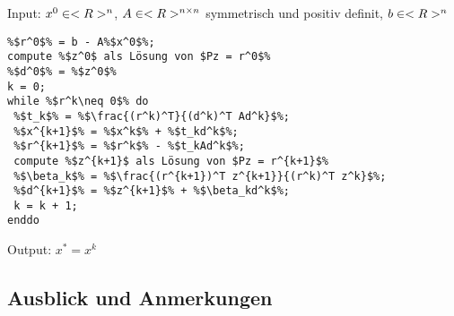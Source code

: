 \begin{algorithm}
	Input: $x^0\in<R>^n$, $A\in<R>^{n \times n}$ symmetrisch und positiv definit, $b\in<R>^n$
	\begin{lstlisting}
%$r^0$% = b - A%$x^0$%;
compute %$z^0$ als Lösung von $Pz = r^0$% 
%$d^0$% = %$z^0$%
k = 0;
while %$r^k\neq 0$% do
 %$t_k$% = %$\frac{(r^k)^T}{(d^k)^T Ad^k}$%;
 %$x^{k+1}$% = %$x^k$% + %$t_kd^k$%;
 %$r^{k+1}$% = %$r^k$% - %$t_kAd^k$%;
 compute %$z^{k+1}$ als Lösung von $Pz = r^{k+1}$%
 %$\beta_k$% = %$\frac{(r^{k+1})^T z^{k+1}}{(r^k)^T z^k}$%;
 %$d^{k+1}$% = %$z^{k+1}$% + %$\beta_kd^k$%;
 k = k + 1;
enddo
	\end{lstlisting}
	Output: $x^\ast=x^k$
\end{algorithm}

\subsection{Ausblick und Anmerkungen}

